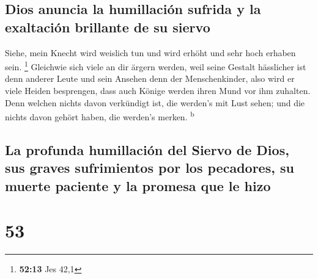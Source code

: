 \hypertarget{dios-anuncia-la-humillaciuxf3n-sufrida-y-la-exaltaciuxf3n-brillante-de-su-siervo}{%
\subsection{Dios anuncia la humillación sufrida y la exaltación
brillante de su
siervo}\label{dios-anuncia-la-humillaciuxf3n-sufrida-y-la-exaltaciuxf3n-brillante-de-su-siervo}}

 Siehe, mein Knecht wird weislich tun und wird erhöht und
sehr hoch erhaben sein. \footnote{\textbf{52:13} Jes 42,1}
 Gleichwie sich viele an dir ärgern werden, weil seine
Gestalt hässlicher ist denn anderer Leute und sein Ansehen denn der
Menschenkinder,  also wird er viele Heiden besprengen,
dass auch Könige werden ihren Mund vor ihm zuhalten. Denn welchen nichts
davon verkündigt ist, die werden's mit Lust sehen; und die nichts davon
gehört haben, die werden's merken. \textsuperscript{b}

\hypertarget{la-profunda-humillaciuxf3n-del-siervo-de-dios-sus-graves-sufrimientos-por-los-pecadores-su-muerte-paciente-y-la-promesa-que-le-hizo}{%
\subsection{La profunda humillación del Siervo de Dios, sus graves
sufrimientos por los pecadores, su muerte paciente y la promesa que le
hizo}\label{la-profunda-humillaciuxf3n-del-siervo-de-dios-sus-graves-sufrimientos-por-los-pecadores-su-muerte-paciente-y-la-promesa-que-le-hizo}}

\hypertarget{section-52}{%
\section{53}\label{section-52}}

